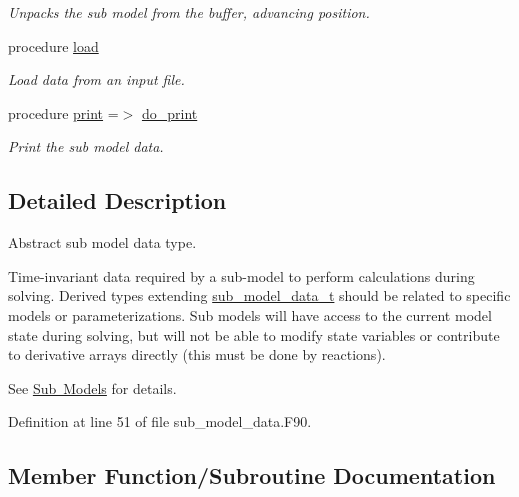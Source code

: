 \begin{DoxyCompactItemize}
\begin{DoxyCompactList}\small\item\em Unpacks the sub model from the buffer, advancing position. \end{DoxyCompactList}\item 
procedure \mbox{\hyperlink{structpmc__sub__model__data_1_1sub__model__data__t_a20b5440b33b4dc9b8f73f6a7befe9e1e}{load}}
\begin{DoxyCompactList}\small\item\em Load data from an input file. \end{DoxyCompactList}\item 
procedure \mbox{\hyperlink{structpmc__sub__model__data_1_1sub__model__data__t_a977960f22c91532d4d3e7e4d7e1a51d5}{print}} =$>$ \mbox{\hyperlink{namespacepmc__sub__model__data_aa1a6115c9e5f44ce5e6716748ba06072}{do\+\_\+print}}
\begin{DoxyCompactList}\small\item\em Print the sub model data. \end{DoxyCompactList}\end{DoxyCompactItemize}


\subsection{Detailed Description}
Abstract sub model data type. 

Time-\/invariant data required by a sub-\/model to perform calculations during solving. Derived types extending \mbox{\hyperlink{structpmc__sub__model__data_1_1sub__model__data__t}{sub\+\_\+model\+\_\+data\+\_\+t}} should be related to specific models or parameterizations. Sub models will have access to the current model state during solving, but will not be able to modify state variables or contribute to derivative arrays directly (this must be done by reactions).

See \mbox{\hyperlink{phlex_sub_model}{Sub Models}} for details. 

Definition at line 51 of file sub\+\_\+model\+\_\+data.\+F90.



\subsection{Member Function/\+Subroutine Documentation}
\mbox{\label{structpmc__sub__model__data_1_1sub__model__data__t_a1957d5f74720ce4ff42598e1507a6bd8}} 
